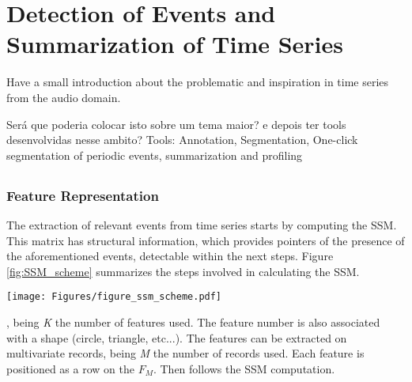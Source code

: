 
%

\chapter{Detection of Events and Summarization of Time Series}
\label{cha:methods1}

Have a small introduction about the problematic and inspiration in time series from the audio domain.

Será que poderia colocar isto sobre um tema maior? e depois ter tools desenvolvidas nesse ambito?
Tools: Annotation, Segmentation, One-click segmentation of periodic events, summarization and profiling

\section{}

\subsection{Feature Representation}

The extraction of relevant events from time series starts by computing the \gls{SSM}. This matrix has structural information, which provides pointers of the presence of the aforementioned events, detectable within the next steps. Figure \ref{fig:SSM_scheme} summarizes the steps involved in calculating the \gls{SSM}.

\begin{figure*}
    \centering
    \texttt{[image: Figures/figure\_ssm\_scheme.pdf]}
    \caption{Main process to reach the \gls{SSM}. The information needed to calculate the \gls{SSM} are the record and the input parameters: the window size (w) and the overlapping percentage (o). The first stage involves the feature extraction process, based on \textit{w} and \textit{o} values. Features are extracted on each window (1, 2..., N), being N the total number of windows. From the first window ($w_1$), are extracted features (f1, f2..., $f_K$}, being \textit{K} the number of features used. The feature number is also associated with a shape (circle, triangle, etc...). The features can be extracted on multivariate records, being \textit{M} the number of records used. Each feature is positioned as a row on the $F_M$. Then follows the \gls{SSM} computation.
    \label{fig:SSM_scheme}
\end{figure*}

